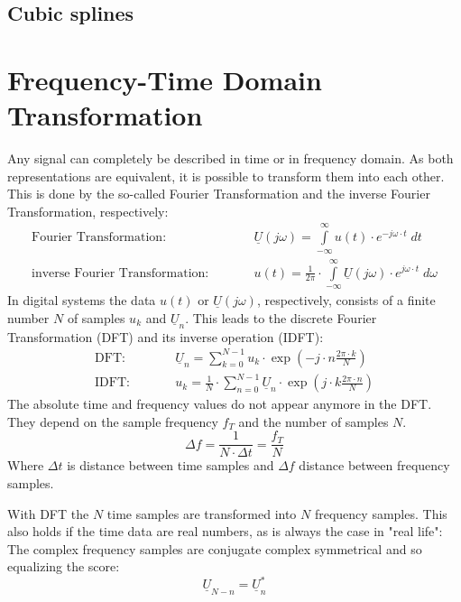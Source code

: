 \subsection{Cubic splines}


\section{Frequency-Time Domain Transformation}

Any signal can completely be described in time or in frequency domain.
As both representations are equivalent, it is possible to transform them
into each other. This is done by the so-called Fourier Transformation and
the inverse Fourier Transformation, respectively:
\begin{eqnarray}
\text{Fourier Transformation:} & \qquad &
     \underline{U}(j\omega) =
     \int\limits_{-\infty}^{\infty} u(t)\cdot e^{-j\omega\cdot t} \; dt \\
\text{inverse Fourier Transformation:} & \qquad &
     u(t) = \frac{1}{2\pi} \cdot \int\limits_{-\infty}^{\infty}
            \underline{U}(j\omega)\cdot e^{j\omega\cdot t} \; d\omega
\end{eqnarray}
In digital systems the data $u(t)$ or $\underline{U}(j\omega)$,
respectively, consists of a finite number $N$ of samples $u_k$ and
$\underline{U}_n$. This leads to the discrete Fourier Transformation
(DFT) and its inverse operation (IDFT):
\begin{eqnarray}
\label{eqn:DFT}
\text{DFT:} & \qquad &
     \underline{U}_n =
     \sum_{k=0}^{N-1} u_k\cdot \exp\left( -j\cdot n\frac{2\pi\cdot k}{N} \right) \\
\label{eqn:IDFT}
\text{IDFT:} & \qquad &
     u_k = \frac{1}{N} \cdot \sum_{n=0}^{N-1}
            \underline{U}_n\cdot \exp\left( j\cdot k\frac{2\pi\cdot n}{N} \right)
\end{eqnarray}
The absolute time and frequency values do not appear anymore in the DFT.
They depend on the sample frequency $f_T$ and the number of samples $N$.
\begin{equation}
\Delta f = \frac{1}{N\cdot\Delta t} = \frac{f_T}{N}
\end{equation}
Where $\Delta t$ is distance between time samples and $\Delta f$
distance between frequency samples.

\addvspace{12pt}

With DFT the $N$ time samples are transformed into $N$ frequency samples.
This also holds if the time data are real numbers, as is always
the case in "real life": The complex frequency samples are conjugate
complex symmetrical and so equalizing the score:
\begin{equation}
\underline{U}_{N-n} = \underline{U}_n^*
\end{equation}

